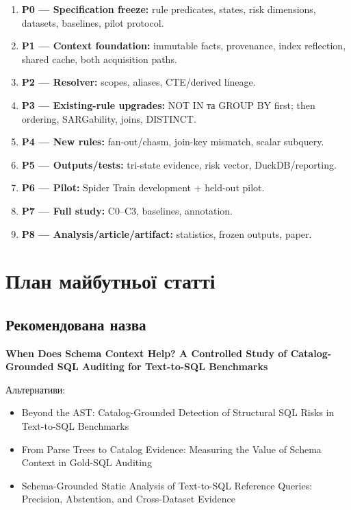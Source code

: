 \documentclass[11pt,a4paper]{article}
\begin{document}
\begin{enumerate}
\item \textbf{P0 --- Specification freeze:} rule predicates, states, risk dimensions,
      datasets, baselines, pilot protocol.
\item \textbf{P1 --- Context foundation:} immutable facts, provenance, index reflection,
      shared cache, both acquisition paths.
\item \textbf{P2 --- Resolver:} scopes, aliases, CTE/derived lineage.
\item \textbf{P3 --- Existing-rule upgrades:} NOT IN та GROUP BY first; then ordering,
      SARGability, joins, DISTINCT.
\item \textbf{P4 --- New rules:} fan-out/chasm, join-key mismatch, scalar subquery.
\item \textbf{P5 --- Outputs/tests:} tri-state evidence, risk vector, DuckDB/reporting.
\item \textbf{P6 --- Pilot:} Spider Train development + held-out pilot.
\item \textbf{P7 --- Full study:} C0--C3, baselines, annotation.
\item \textbf{P8 --- Analysis/article/artifact:} statistics, frozen outputs, paper.
\end{enumerate}

\section{План майбутньої статті}

\subsection{Рекомендована назва}

\begin{thesisbox}
\begin{english}
\textbf{When Does Schema Context Help? A Controlled Study of Catalog-Grounded SQL
Auditing for Text-to-SQL Benchmarks}
\end{english}
\end{thesisbox}

Альтернативи:

\begin{itemize}
\item \begin{english}Beyond the AST: Catalog-Grounded Detection of Structural SQL Risks in
Text-to-SQL Benchmarks\end{english}
\item \begin{english}From Parse Trees to Catalog Evidence: Measuring the Value of
Schema Context in Gold-SQL Auditing\end{english}
\item \begin{english}Schema-Grounded Static Analysis of Text-to-SQL Reference Queries:
Precision, Abstention, and Cross-Dataset Evidence\end{english}
\end{itemize}
\end{document}
